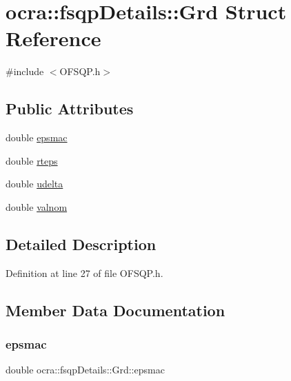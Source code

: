 \hypertarget{structocra_1_1fsqpDetails_1_1Grd}{}\section{ocra\+:\+:fsqp\+Details\+:\+:Grd Struct Reference}
\label{structocra_1_1fsqpDetails_1_1Grd}


{\ttfamily \#include $<$O\+F\+S\+Q\+P.\+h$>$}

\subsection*{Public Attributes}
\begin{DoxyCompactItemize}
\item 
double \hyperlink{structocra_1_1fsqpDetails_1_1Grd_ac683dea891e814e3f8dbb8e7e7ee513a}{epsmac}
\item 
double \hyperlink{structocra_1_1fsqpDetails_1_1Grd_ae0d611f0b701559540811d37c36dba6a}{rteps}
\item 
double \hyperlink{structocra_1_1fsqpDetails_1_1Grd_aa1e099590097141f48dc6445cbefd5b1}{udelta}
\item 
double \hyperlink{structocra_1_1fsqpDetails_1_1Grd_ab59ae66f9f4318da4a7b071ff2c9740a}{valnom}
\end{DoxyCompactItemize}


\subsection{Detailed Description}


Definition at line 27 of file O\+F\+S\+Q\+P.\+h.



\subsection{Member Data Documentation}
\hypertarget{structocra_1_1fsqpDetails_1_1Grd_ac683dea891e814e3f8dbb8e7e7ee513a}{}\label{structocra_1_1fsqpDetails_1_1Grd_ac683dea891e814e3f8dbb8e7e7ee513a} 
\subsubsection{\texorpdfstring{epsmac}{epsmac}}
{\footnotesize\ttfamily double ocra\+::fsqp\+Details\+::\+Grd\+::epsmac}



